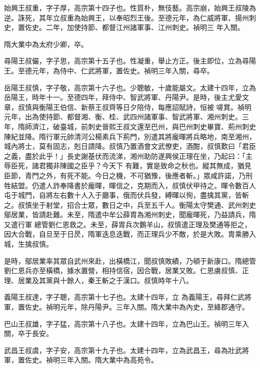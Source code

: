 \begin{pinyinscope}
 始興王叔重，字子厚，高宗第十四子也。性質朴，無伎藝。高宗崩，始興王叔陵為逆。誅死，其年立叔重為始興王，以奉昭烈王後。至德元年，為仁威將軍、揚州刺史，置佐史。二年，加使持節、都督江州諸軍事、江州刺史。禎明三
 年入關。



 隋大業中為太府少卿，卒。



 尋陽王叔儼，字子思，高宗第十五子也。性凝重，舉止方正。後主即位，立為尋陽王。至德元年，為侍中、仁武將軍，置佐史。禎明三年入關，尋卒。



 岳陽王叔慎，字子敬，高宗第十六子也。少聰敏，十歲能屬文。太建十四年，立為岳陽王，時年十一。至德四年，拜侍中、智武將軍、丹陽尹。是時，後主尤愛文章，叔慎與衡陽王伯信、新蔡王叔齊等日夕陪侍，每應詔賦詩，恒被
 嗟賞。禎明元年，出為使持節、都督湘、衡、桂、武四州諸軍事、智武將軍、湘州刺史。三年，隋師濟江，破臺城，前刺史晉熙王叔文還至巴州，與巴州刺史畢寶、荊州刺史陳紀並降。隋行軍元帥清河公楊素兵下荊門，別遣其將龐暉將兵略地，南至湘州，城內將士，莫有固志，剋日請降。叔慎乃置酒會文武僚吏，酒酣，叔慎歎曰「君臣之義，盡於此乎！」長史謝基伏而流涕，湘州助防遂興侯正理在坐，乃起曰：「主辱臣死，諸君獨非陳國之臣乎？今天下
 有難，實是致命之秋也。縱其無成，猶見臣節，青門之外，有死不能。今日之機，不可猶豫，後應者斬。」眾咸許諾，乃刑牲結盟。仍遣人詐奉降書於龐暉，暉信之，克期而入，叔慎伏甲待之。暉令數百人屯于城門，自將左右數十人入于廳事，俄而伏兵發，縛暉以徇，盡擒其黨，皆斬之。叔慎坐于射堂，招合士眾，數日之中，兵至五千人。衡陽太守樊通、武州刺史鄔居業，皆請赴難。未至，隋遣中牟公薛胄為湘州刺史，聞龐暉死，乃益請兵，隋又遣行軍
 總管劉仁恩救之。未至，薛胄兵次鵝羊山，叔慎遣正理及樊通等拒之，因大合戰，自旦至于日昃，隋軍迭息迭戰，而正理兵少不敵，於是大敗。胄乘勝入城，生擒叔慎。



 是時，鄔居業率其眾自武州來赴，出橫橋江，聞叔慎敗績，乃頓于新康口。隋總管劉仁恩兵亦至橫橋，據水置營，相持信宿，因合戰，居業又敗。仁恩虜叔慎、正理、居業及其黨與十餘人，秦王斬之于漢口。叔慎時年十八。



 義陽王叔達，字子聰，高宗第十七子也。太建十四年，立
 為義陽王，尋拜仁武將軍，置佐史。禎明元年，除丹陽尹。三年入關。隋大業中為內史，至絳郡通守。



 巴山王叔雄，字子猛，高宗第十八子也。太建十四年，立為巴山王。禎明三年入關，卒于長安。



 武昌王叔虞，字子安，高宗第十九子也。太建十四年，立為武昌王，尋為壯武將軍，置佐史。禎明三年入關。隋大業中為高苑令。




\end{pinyinscope}
